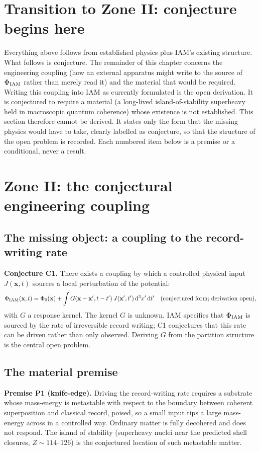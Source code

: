 \section{Transition to Zone II: conjecture begins here}\label{sec:ge_transition}
Everything above follows from established physics plus IAM's existing structure. What follows is conjecture. The remainder of this chapter concerns the
engineering coupling (how an external apparatus might write to the source of $\Phi_{\rm IAM}$ rather than merely read it) and the material that would
be required. Writing this coupling into IAM as currently formulated is the open derivation. It is conjectured to require a material (a long-lived island-of-stability superheavy held in macroscopic quantum coherence) whose existence is not established. This section therefore cannot be
derived. It states only the form that the missing physics would have to take, clearly labelled as conjecture, so that the structure of the open
problem is recorded. Each numbered item below is a premise or a conditional, never a result.

\section{Zone II: the conjectural engineering coupling}\label{sec:ge_zone2}

\subsection{The missing object: a coupling to the record-writing rate}
\textbf{Conjecture C1.} There exists a coupling by which a controlled physical input $J(\mathbf x,t)$ sources a local perturbation of the potential:
\begin{equation}
\Phi_{\rm IAM}(\mathbf x,t)=\Phi_0(\mathbf x)+\int G(\mathbf x-\mathbf x',t-t')\,J(\mathbf x',t')\,\mathrm d^3x'\,\mathrm dt'
\quad\text{(conjectured form; derivation open)},
\label{eq:ge_kernel}
\end{equation}
with $G$ a response kernel. \conjecture{} The kernel $G$ is unknown. IAM specifies that $\Phi_{\rm IAM}$ is sourced by the rate of irreversible record
writing; C1 conjectures that this rate can be driven rather than only observed. Deriving $G$ from the partition structure is the central open problem. \openprob

\subsection{The material premise}
\textbf{Premise P1 (knife-edge).} Driving the record-writing rate requires a substrate whose mass-energy is metastable with respect to the boundary
between coherent superposition and classical record, poised, so a small input tips a large mass-energy across in a controlled way. Ordinary matter is
fully decohered and does not respond. The island of stability (superheavy nuclei near the predicted shell closures, $Z\sim114$--126) is the conjectured
location of such metastable matter. \conjecture

